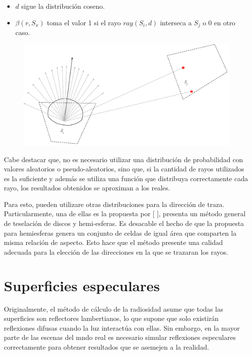 	\begin{itemize}
		\item  $d$ sigue la distribución coseno.
		\item $\beta(r, S_{x})$ toma el valor 1 si el rayo $ray(S_{i},d)$ interseca a $S_{j}$ o $0$ en otro caso.
	\end{itemize}

\vspace{5mm}
\begin{figure}[H]
	\centering
	\includegraphics[width=\linewidth]{assets/Raytracing}
	\label{img:ff}
\end{figure}

Cabe destacar que, no es necesario utilizar una distribución de probabilidad con valores aleatorios o pseudo-aleatorios, sino que, si la cantidad de rayos utilizados es la suficiente y además se utiliza una función que distribuya correctamente cada rayo, los resultados obtenidos se aproximan a los reales.

Para esto, pueden utilizare otras distribuciones para la dirección de traza. Particularmente, una de ellas es la propuesta por [\citeauthor{Beckers} \cite{Beckers}], presenta un método general de teselación de discos y hemi-esferas. Es desacable el hecho de que la propuesta para hemiesferas genera un conjunto de celdas de igual área que comparten la misma relación de aspecto. Esto hace que el método presente una calidad adecuada para la elección de las direcciones en la que se trazaran los rayos.

\section{Superficies especulares}

Originalmente, el método de cálculo de la radiosidad asume que todas las superficies son reflectores lambertianos, lo que supone que solo existirán reflexiones difusas cuando la luz interactúa con ellas. Sin embargo, en la mayor parte de las escenas del mndo real es necesario simular reflexiones especulares correctamente para obtener resultados que se asemejen a la realidad.

